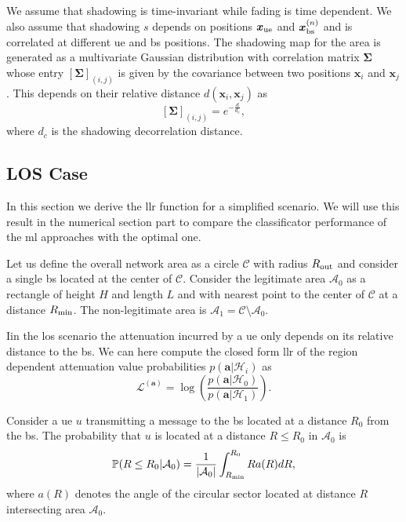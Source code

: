 \documentclass[twocolumns]{IEEEtran}
\begin{document}
We assume that shadowing is time-invariant while fading is time dependent. We also assume that shadowing $s$ depends on positions $\bm{x}_{\rm ue}$ and $\bm{x}_{\rm bs}^{(n)}$ and is correlated at different \ac{ue} and \ac{bs} positions. The shadowing map for the area is generated as a multivariate Gaussian distribution with correlation matrix $\bm{\Sigma}$ whose entry $\left[\bm{\Sigma}\right]_{(i,j)}$ is given by the covariance between two positions $\bm{x}_i$ and $\bm{x}_j$. This depends on their relative distance $d(\bm{x}_i,\bm{x}_j)$ as
\begin{equation}\label{eq: coor mat}
    \left[\bm{\Sigma}\right]_{(i,j)} = e^{-\frac{d}{d_c}},
\end{equation}
where $d_c$ is the shadowing decorrelation distance. 

\subsection{LOS Case}

In this section we derive the \ac{llr} function for a simplified scenario. We will use this result in the numerical section part to compare the classificator performance of the \ac{ml} approaches with the optimal one.

Let us define the overall network area as a circle $\mathcal{C}$ with radius $R_{\rm out}$ and consider a single \ac{bs} located at the center of $\mathcal{C}$. Consider the legitimate area $\mathcal{A}_{0}$ as a rectangle of height $H$ and length $L$ and with nearest point to the center of $\mathcal{C}$ at a distance $R_{\rm min}$. The non-legitimate area is $\mathcal{A}_1 = \mathcal{C} \setminus \mathcal{A}_0$.

Iin the \ac{los} scenario the attenuation incurred by a \ac{ue} only depends on its relative distance to the \ac{bs}. We can here compute the closed form \ac{llr} of the region dependent attenuation value probabilities $p(\bm{a}|\mathcal{H}_i)$ as
\begin{equation}\label{eq:lr}
    \mathcal{L}^{(\bm{a})}=\log\left(\frac{p(\bm{a}|\mathcal{H}_0)}{p(\bm{a}|\mathcal{H}_1)}\right).
\end{equation}

Consider a \ac{ue} $u$ transmitting a message to the \ac{bs} located at a distance $R_0$ from the \ac{bs}. The probability that $u$ is located at a distance $R\le R_0$ in $\mathcal{A}_0$ is
\begin{equation}\label{eq:cdf}
     \mathbb{P}(R \le R_0|\mathcal{A}_0) = \frac{1}{|\mathcal{A}_0|}\int_{R_{\rm min}}^{R_0} R a(R) dR,
\end{equation}
where $a(R)$ denotes the angle of the circular sector located at distance $R$ intersecting area $\mathcal{A}_0$.
\end{document}
